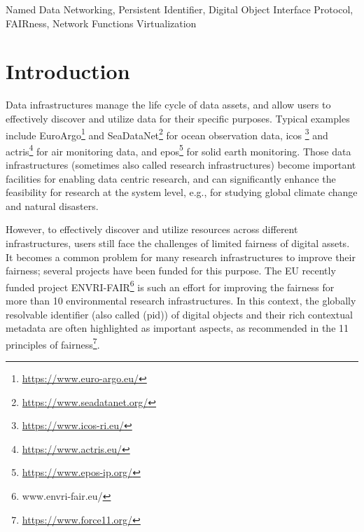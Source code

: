 \documentclass[conference]{IEEEtran}
\begin{document}
\begin{abstract}
\end{abstract}

\begin{IEEEkeywords}
Named Data Networking, Persistent Identifier, Digital Object Interface Protocol, FAIRness, Network Functions Virtualization
\end{IEEEkeywords}

\section{Introduction}
Data infrastructures manage the life cycle of data assets, and allow users to effectively discover and utilize data for their specific purposes. Typical examples include EuroArgo\footnote{\url{https://www.euro-argo.eu/}} and SeaDataNet\footnote{\url{https://www.seadatanet.org/}} for ocean observation data, \gls{icos} \footnote{\url{https://www.icos-ri.eu/}} and \gls{actris}\footnote{\url{https://www.actris.eu/}} for air monitoring data, and \gls{epos}\footnote{\url{https://www.epos-ip.org/}} for solid earth monitoring. Those data infrastructures (sometimes also called research infrastructures) become important facilities for enabling data centric research, and can significantly enhance the feasibility for research at the system level, e.g., for studying global climate change and natural disasters.

However, to effectively discover and utilize resources across different infrastructures, users still face the challenges of limited \gls{fairness} of digital assets. It becomes a common problem for many research infrastructures to improve their \gls{fairness}; several projects have been funded for this purpose. The EU recently funded project ENVRI-FAIR\footnote{www.envri-fair.eu/} is such an effort for improving the \gls{fairness} for more than 10 environmental research infrastructures. In this context, the globally resolvable identifier (also called (\gls{pid})) of digital objects and their rich contextual metadata are often highlighted as important aspects, as recommended in the 11 principles of \gls{fairness}\footnote{\url{https://www.force11.org/}}.
\end{document}
